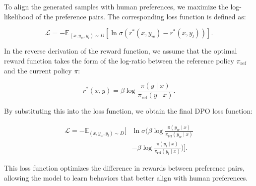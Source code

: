 To align the generated samples with human preferences, we maximize the log-likelihood of the preference pairs. The corresponding loss function is defined as:

\begin{equation}
\mathcal{L}= -\mathbb{E}_{(x, y_w, y_l) \sim D} \left[ \ln \sigma(r^*(x, y_w) - r^*(x, y_l)) \right].
\end{equation}

In the reverse derivation of the reward function, we assume that the optimal reward function takes the form of the log-ratio between the reference policy $\pi_{\text{ref}}$ and the current policy $\pi$:

\begin{equation}
r^*(x, y) = \beta \log \frac{\pi(y \mid x)}{\pi_{\text{ref}}(y \mid x)}.
\end{equation}

By substituting this into the loss function, we obtain the final DPO loss function:

\begin{equation}
\begin{aligned}
\mathcal{L} = -\mathbb{E}_{(x, y_w, y_l) \sim D} \Big[ &\ln \sigma\Big( \beta \log \frac{\pi(y_w \mid x)}{\pi_{\text{ref}}(y_w \mid x)} \\
&- \beta \log \frac{\pi(y_l \mid x)}{\pi_{\text{ref}}(y_l \mid x)} \Big) \Big].
\end{aligned}
\end{equation}

This loss function optimizes the difference in rewards between preference pairs, allowing the model to learn behaviors that better align with human preferences.


